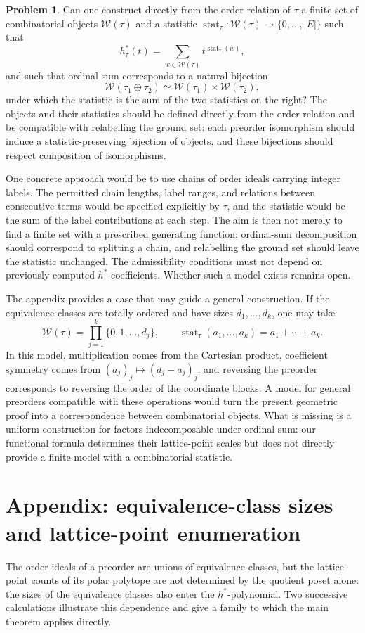 \documentclass[11pt,reqno]{amsart}
\numberwithin{equation}{section}
\theoremstyle{definition}
\theoremstyle{remark}
\theoremstyle{definition}
\newtheorem{problem}[theorem]{Problem}
\begin{document}
\begin{problem}\label{combinatorial}
Can one construct directly from the order relation of $\tau$ a finite set of combinatorial objects $\mathcal W(\tau)$ and a statistic
$\operatorname{stat}_\tau:\mathcal W(\tau)\to\{0,\ldots,|E|\}$ such that
\[
 h_\tau^*(t)=\sum_{w\in\mathcal W(\tau)}t^{\operatorname{stat}_\tau(w)},
\]
and such that ordinal sum corresponds to a natural bijection
\[
 \mathcal W(\tau_1\oplus\tau_2)
       \simeq\mathcal W(\tau_1)\times\mathcal W(\tau_2),
\]
under which the statistic is the sum of the two statistics on the right? The objects and their statistics should be defined directly from the order relation and be compatible with relabelling the ground set: each preorder isomorphism should induce a statistic-preserving bijection of objects, and these bijections should respect composition of isomorphisms.
\end{problem}
One concrete approach would be to use chains of order ideals carrying integer labels. The permitted chain lengths, label ranges, and relations between consecutive terms would be specified explicitly by $\tau$, and the statistic would be the sum of the label contributions at each step. The aim is then not merely to find a finite set with a prescribed generating function: ordinal-sum decomposition should correspond to splitting a chain, and relabelling the ground set should leave the statistic unchanged. The admissibility conditions must not depend on previously computed $h^*$-coefficients. Whether such a model exists remains open.

The appendix provides a case that may guide a general construction. If the equivalence classes are totally ordered and have sizes $d_1,\ldots,d_k$, one may take
\[
 \mathcal W(\tau)=\prod_{j=1}^k\{0,1,\ldots,d_j\},
 \qquad \operatorname{stat}_\tau(a_1,\ldots,a_k)=a_1+\cdots+a_k.
\]
In this model, multiplication comes from the Cartesian product, coefficient symmetry comes from
$(a_j)_j\mapsto(d_j-a_j)_j$, and reversing the preorder corresponds to reversing the order of the coordinate blocks. A model for general preorders compatible with these operations would turn the present geometric proof into a correspondence between combinatorial objects. What is missing is a uniform construction for factors indecomposable under ordinal sum: our functional formula determines their lattice-point scales but does not directly provide a finite model with a combinatorial statistic.

\clearpage
\appendix
\section*{Appendix: equivalence-class sizes and lattice-point enumeration}
The order ideals of a preorder are unions of equivalence classes, but the lattice-point counts of its polar polytope are not determined by the quotient poset alone: the sizes of the equivalence classes also enter the $h^*$-polynomial. Two successive calculations illustrate this dependence and give a family to which the main theorem applies directly.
\end{document}
